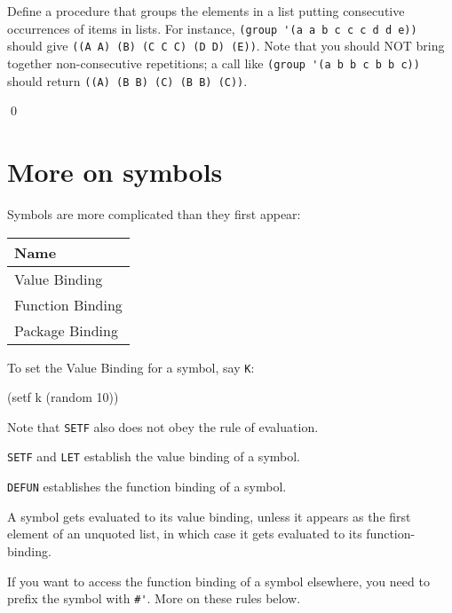 \documentclass[a4paper,11pt]{article}
\begin{document}
\begin{uexercise}
Define a procedure that groups the elements in a list putting consecutive occurrences of items in lists. For instance, \Verb+(group '(a a b c c c d d e))+ should give \Verb+((A A) (B) (C C C) (D D) (E))+. Note that you should NOT bring together non-consecutive repetitions; a call like  \Verb+(group '(a b b c b b c))+ should return \Verb+((A) (B B) (C) (B B) (C))+.

\qed
\end{uexercise}


\section{More on symbols}

\begin{uenum}
\item Symbols are more complicated than they first appear: 

\renewcommand{\arraystretch}{2.4}
\begin{tabular}{|l|}
\hline
{Name} \\ \hline
{Value Binding} \\ \hline
{Function Binding}\\ \hline 
Package Binding\\ \hline
\end{tabular}

\item To set the Value Binding for a symbol, say \Verb+K+:

\begin{lispcode}
(setf k (random 10)) 
\end{lispcode}

\item Note that \Verb+SETF+ also does not obey the rule of evaluation.

\item \Verb+SETF+ and \Verb+LET+ establish the value binding of a symbol.
\item \Verb+DEFUN+ establishes the function binding of a symbol.
\item A symbol gets evaluated to its value binding, unless it appears as the first element of an unquoted list, in which case it gets evaluated to its function-binding.
\item If you want to access the function binding of a symbol elsewhere, you need to prefix the symbol with \Verb+#'+. More on these rules below.


\end{uenum}
\end{document}
